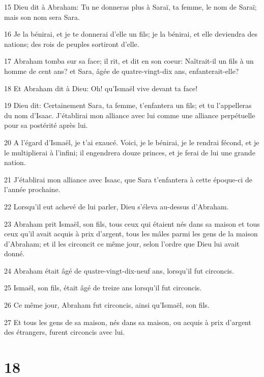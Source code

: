 \par 15 Dieu dit à Abraham: Tu ne donneras plus à Saraï, ta femme, le nom de Saraï; mais son nom sera Sara.
\par 16 Je la bénirai, et je te donnerai d'elle un fils; je la bénirai, et elle deviendra des nations; des rois de peuples sortiront d'elle.
\par 17 Abraham tomba sur sa face; il rit, et dit en son coeur: Naîtrait-il un fils à un homme de cent ans? et Sara, âgée de quatre-vingt-dix ans, enfanterait-elle?
\par 18 Et Abraham dit à Dieu: Oh! qu'Ismaël vive devant ta face!
\par 19 Dieu dit: Certainement Sara, ta femme, t'enfantera un fils; et tu l'appelleras du nom d'Isaac. J'établirai mon alliance avec lui comme une alliance perpétuelle pour sa postérité après lui.
\par 20 A l'égard d'Ismaël, je t'ai exaucé. Voici, je le bénirai, je le rendrai fécond, et je le multiplierai à l'infini; il engendrera douze princes, et je ferai de lui une grande nation.
\par 21 J'établirai mon alliance avec Isaac, que Sara t'enfantera à cette époque-ci de l'année prochaine.
\par 22 Lorsqu'il eut achevé de lui parler, Dieu s'éleva au-dessus d'Abraham.
\par 23 Abraham prit Ismaël, son fils, tous ceux qui étaient nés dans sa maison et tous ceux qu'il avait acquis à prix d'argent, tous les mâles parmi les gens de la maison d'Abraham; et il les circoncit ce même jour, selon l'ordre que Dieu lui avait donné.
\par 24 Abraham était âgé de quatre-vingt-dix-neuf ans, lorsqu'il fut circoncis.
\par 25 Ismaël, son fils, était âgé de treize ans lorsqu'il fut circoncis.
\par 26 Ce même jour, Abraham fut circoncis, ainsi qu'Ismaël, son fils.
\par 27 Et tous les gens de sa maison, nés dans sa maison, ou acquis à prix d'argent des étrangers, furent circoncis avec lui.

\chapter{18}

